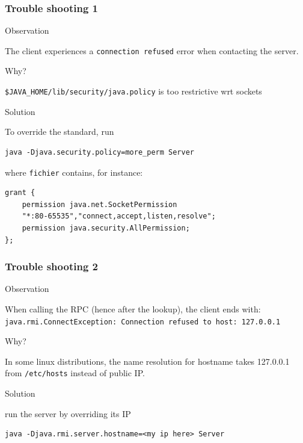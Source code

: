 \documentclass[bigger,hyperref={colorlinks=true, urlcolor=red, plainpages=false, pdfpagelabels, bookmarksnumbered}]{beamer}
\begin{document}
\begin{frame}[fragile]
\frametitle{Trouble shooting 1}
\label{sec-3-12}
\begin{block}{Observation}
\label{sec-3-12-1}

    The client experiences a \texttt{connection refused} error when 
    contacting the server.
\end{block}
\begin{block}{Why?}
\label{sec-3-12-2}

    \texttt{\$JAVA\_HOME/lib/security/java.policy} is too restrictive wrt sockets
\end{block}
\begin{block}{Solution}
\label{sec-3-12-3}

   To override the standard, run

\lstset{language=java}
\begin{lstlisting}
java -Djava.security.policy=more_perm Server
\end{lstlisting}
   where \texttt{fichier} contains, for instance:

\lstset{language=java}
\begin{lstlisting}
grant {
    permission java.net.SocketPermission
    "*:80-65535","connect,accept,listen,resolve";
    permission java.security.AllPermission;
};
\end{lstlisting}
   
\end{block}
\end{frame}
\begin{frame}[fragile]
\frametitle{Trouble shooting 2}
\label{sec-3-13}
\begin{block}{Observation}
\label{sec-3-13-1}

   When calling the RPC (hence after the lookup), the client ends with:
   \texttt{java.rmi.ConnectException: Connection refused to host: 127.0.0.1}
\end{block}
\begin{block}{Why?}
\label{sec-3-13-2}

   In some linux distributions, the name resolution for hostname
   takes 127.0.0.1 from \texttt{/etc/hosts} instead of public IP.
\end{block}
\begin{block}{Solution}
\label{sec-3-13-3}

run the server by overriding its IP

\lstset{language=java}
\begin{lstlisting}
java -Djava.rmi.server.hostname=<my ip here> Server
\end{lstlisting}
\end{block}
\end{frame}
\end{document}
